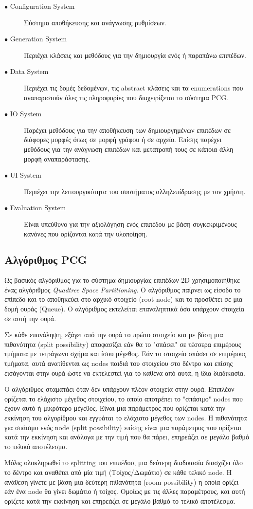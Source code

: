 \begin{description}
\item[$\bullet$ Configuration System] Σύστημα αποθήκευσης και ανάγνωσης ρυθμίσεων.
\item[$\bullet$ Generation System] Περιέχει κλάσεις και μεθόδους για την δημιουργία ενός ή παραπάνω επιπέδων.
\item[$\bullet$ Data System] Περιέχει τις δομές δεδομένων, τις abstract κλάσεις και τα enumerations που αναπαριστούν όλες τις πληροφορίες που διαχειρίζεται το σύστημα PCG.
\item[$\bullet$ IO System] Παρέχει μεθόδους για την αποθήκευση των δημιουργημένων επιπέδων σε διάφορες μορφές όπως σε μορφή γράφου ή σε αρχείο. Επίσης παρέχει μεθόδους για την ανάγνωση επιπέδων και μετατροπή τους σε κάποια άλλη μορφή αναπαράστασης.
\item[$\bullet$ UI System] Περιέχει την λειτουργικότητα του συστήματος αλληλεπίδρασης με τον χρήστη.
\item[$\bullet$ Evaluation System] Είναι υπεύθυνο για την αξιολόγηση ενός επιπέδου με βάση συγκεκριμένους κανόνες που ορίζονται κατά την υλοποίηση.
\end{description}

\subsection{Αλγόριθμος PCG}
Ως βασικός αλγόριθμος για το σύστημα δημιουργίας επιπέδων 2D χρησιμοποιήθηκε ένας αλγόριθμος \textit{Quadtree Space Partitioning}. O αλγόριθμος παίρνει ως είσοδο το επίπεδο και το αποθηκεύει στο αρχικό στοιχείο (root node) και το προσθέτει σε μια δομή ουράς (Queue). Ο αλγόριθμος εκτελείται επαναληπτικά όσο υπάρχουν στοιχεία σε αυτή την ουρά.
\par
Σε κάθε επανάληψη, εξάγει από την ουρά το πρώτο στοιχείο και με βάση μια πιθανότητα (split possibility) αποφασίζει εάν θα το "σπάσει" σε τέσσερα επιμέρους τμήματα με τετράγωνο σχήμα και ίσου μέγεθος. Εάν το στοιχείο σπάσει σε επιμέρους τμήματα, αυτά ανατίθενται ως nodes παιδιά του στοιχείου στο δέντρο και επίσης εισάγονται στην ουρά ώστε να εκτελεστεί για το καθένα από αυτά, η ίδια διαδικασία.
\par
Ο αλγόριθμος σταματάει όταν δεν υπάρχουν πλέον στοιχεία στην ουρά. Επιπλέον ορίζεται το ελάχιστο μέγεθος στοιχείου, το οποίο αποτρέπει το "σπάσιμο" nodes που έχουν αυτό ή μικρότερο μέγεθος. Είναι μια παράμετρος που ορίζεται κατά την εκκίνηση του αλγορίθμου και εγγυάται το ελάχιστο μέγεθος των nodes. Η πιθανότητα για σπάσιμο ενός node (split possibility) επίσης είναι μια παράμετρος που ορίζεται κατά την εκκίνηση και ανάλογα με την τιμή που θα πάρει, επηρεάζει σε μεγάλο βαθμό το τελικό αποτέλεσμα.
\par
Μόλις ολοκληρωθεί το splitting του επιπέδου, μια δεύτερη διαδικασία διασχίζει όλο το δέντρο και αναθέτει από μία τιμή (Τοίχος/Δωμάτιο) σε κάθε τελικό node. Η ανάθεση γίνετε με βάση μια δεύτερη πιθανότητα (room possibility) η οποία ορίζει εάν ένα node θα γίνει δωμάτιο ή τοίχος. Ομοίως με τις άλλες παραμέτρους, και αυτή ορίζετε κατά την εκκίνηση και επηρεάζει σε μεγάλο βαθμό το τελικό αποτέλεσμα.


